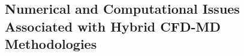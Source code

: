 \documentclass[preprint,12pt]{elsarticle}
\begin{document}


\subsection{Numerical and Computational Issues Associated with Hybrid CFD-MD Methodologies}
\label{sec:intro_issues}

\end{document}
